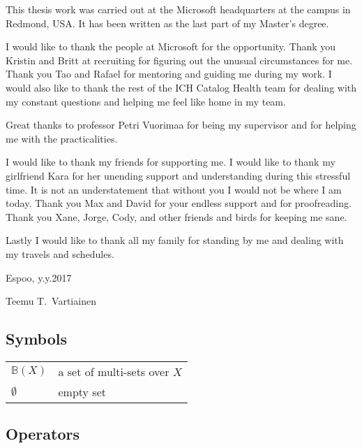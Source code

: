 
This thesis work was carried out at the Microsoft headquarters at the campus in Redmond, USA.
It has been written as the last part of my Master's degree.

I would like to thank the people at Microsoft for the opportunity.
Thank you Kristin and Britt at recruiting for figuring out the unusual circumstances for me.
Thank you Tao and Rafael for mentoring and guiding me during my work.
I would also like to thank the rest of the ICH Catalog Health team for dealing with my constant questions
and helping me feel like home in my team.

Great thanks to professor Petri Vuorimaa for being my supervisor and for helping me with the practicalities.

I would like to thank my friends for supporting me.
I would like to thank my girlfriend Kara for her unending support and understanding during this stressful time.
It is not an understatement that without you I would not be where I am today.
Thank you Max and David for your endless support and for proofreading.
Thank you Xane, Jorge, Cody, and other friends and birds for keeping me sane.

Lastly I would like to thank all my family for standing by me and dealing with my travels and schedules.

\vspace{5cm}
Espoo, y.y.2017

\vspace{5mm}
{\hfill Teemu T.\ Vartiainen \hspace{1cm}}

\newpage
\thesistableofcontents


\subsection*{Symbols}

\begin{tabular}{ll}
$\mathbb{B}(X)$  & a set of multi-sets over $X$ \\
$\emptyset$      & empty set \\
\end{tabular}

\subsection*{Operators}

